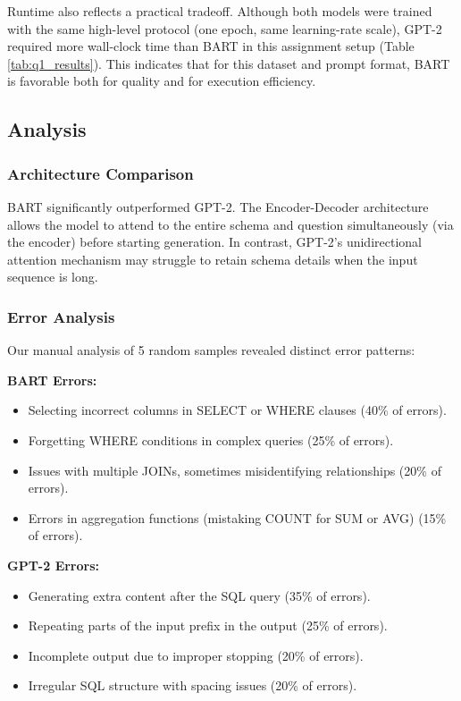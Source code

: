 Runtime also reflects a practical tradeoff. Although both models were trained with the same high-level protocol (one epoch, same learning-rate scale), GPT-2 required more wall-clock time than BART in this assignment setup (Table \ref{tab:q1_results}). This indicates that for this dataset and prompt format, BART is favorable both for quality and for execution efficiency.

\subsection{Analysis}

\subsubsection{Architecture Comparison}
BART significantly outperformed GPT-2. The Encoder-Decoder architecture allows the model to attend to the entire schema and question simultaneously (via the encoder) before starting generation. In contrast, GPT-2's unidirectional attention mechanism may struggle to retain schema details when the input sequence is long.

\subsubsection{Error Analysis}
Our manual analysis of 5 random samples revealed distinct error patterns:

\textbf{BART Errors:}
\begin{itemize}
    \item Selecting incorrect columns in SELECT or WHERE clauses (40\% of errors).
    \item Forgetting WHERE conditions in complex queries (25\% of errors).
    \item Issues with multiple JOINs, sometimes misidentifying relationships (20\% of errors).
    \item Errors in aggregation functions (mistaking COUNT for SUM or AVG) (15\% of errors).
\end{itemize}

\textbf{GPT-2 Errors:}
\begin{itemize}
    \item Generating extra content after the SQL query (35\% of errors).
    \item Repeating parts of the input prefix in the output (25\% of errors).
    \item Incomplete output due to improper stopping (20\% of errors).
    \item Irregular SQL structure with spacing issues (20\% of errors).
\end{itemize}

